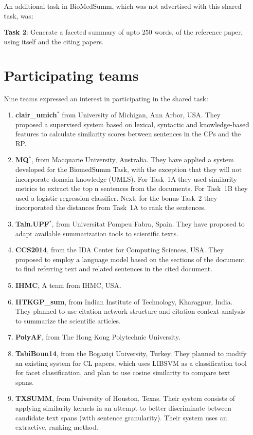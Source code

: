 \documentclass[11pt]{article}
\begin{document}
An additional task in BioMedSumm, which was not advertised with this shared task, was:

{\bf Task 2}: Generate a faceted summary of upto 250 words, of the 
reference paper, using itself and the citing papers.
\section{Participating teams}
Nine teams expressed an interest in participating in the shared task:
\begin{enumerate}
\item{{\bf clair\_umich$^{*}$} from University of Michigan, Ann Arbor, USA. They proposed a supervised system based on lexical, syntactic and knowledge-based features to calculate similarity scores between sentences in the CPs and the RP.}
\vspace{-.3cm}
\item{{\bf MQ$^{*}$}, from Macquarie University, Australia. They have applied a system developed for the BiomedSumm Task,
  with the exception that they will not incorporate domain knowledge (UMLS). For Task~1A they used similarity metrics to extract the top n sentences from the documents. For Task~1B they used a logistic regression classifier. Next, for the bonus Task~2 they incorporated the distances from Task~1A to rank the sentences.}
\vspace{-.3cm}
\item{{\bf Taln.UPF$^{*}$}, from Universitat Pompeu Fabra, Spain. They have proposed to adapt available summarization tools to scientific texts.}
\vspace{-.3cm}
\item{{\bf CCS2014}, from the IDA Center for Computing Sciences, USA. They proposed to employ a language model based on the sections of the document to find referring text and related sentences in the cited document.}
\vspace{-.3cm}
\item{{\bf IHMC}, A team from IHMC, USA.}
\vspace{-.3cm}
\item{{\bf IITKGP\_sum}, from Indian Institute of Technology, Kharagpur, India. They planned to use citation network structure and
  citation context analysis to summarize the scientific articles.}
\vspace{-.3cm}
\item{{\bf PolyAF}, from The Hong Kong Polytechnic University.}
\vspace{-.3cm}
\item{{\bf TabiBoun14}, from the Bogaziçi University, Turkey. They planned to modify an existing system for CL papers, which uses LIBSVM as a classification tool for facet classification, and plan to use cosine similarity to compare text spans.}
\vspace{-.3cm}
\item{{\bf TXSUMM}, from University of Houston, Texas. Their system consists of applying similarity kernels in an attempt to better
  discriminate between candidate text spans (with sentence granularity). Their system uses an extractive, ranking method.}
\end{enumerate}
\end{document}
